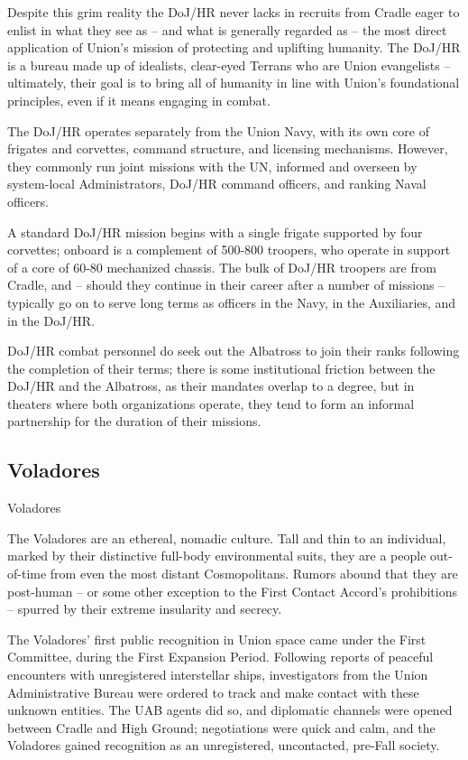 Despite this grim reality the DoJ/HR never lacks in recruits from Cradle eager to enlist in what
they see as -- and what is generally regarded as -- the most direct application of Union’s mission
of protecting and uplifting humanity. The DoJ/HR is a bureau made up of idealists, clear-eyed
Terrans who are Union evangelists -- ultimately, their goal is to bring all of humanity in line with
Union’s foundational principles, even if it means engaging in combat.

The DoJ/HR operates separately from the Union Navy, with its own core of frigates and corvettes,
command structure, and licensing mechanisms. However, they commonly run joint missions with
the UN, informed and overseen by system-local Administrators, DoJ/HR command officers, and
ranking Naval officers.

A standard DoJ/HR mission begins with a single frigate supported by four corvettes; onboard is a
complement of 500-800 troopers, who operate in support of a core of 60-80 mechanized chassis.
The bulk of DoJ/HR troopers are from Cradle, and -- should they continue in their career after a
number of missions -- typically go on to serve long terms as officers in the Navy, in the Auxiliaries,
and in the DoJ/HR.

DoJ/HR combat personnel do seek out the Albatross to join their ranks following the completion of
their terms; there is some institutional friction between the DoJ/HR and the Albatross, as their
mandates overlap to a degree, but in theaters where both organizations operate, they tend to form
an informal partnership for the duration of their missions.



\subsection{Voladores}

Voladores

The Voladores are an ethereal, nomadic culture. Tall and thin to an individual, marked by their
distinctive full-body environmental suits, they are a people out-of-time from even the most
distant Cosmopolitans. Rumors abound that they are post-human -- or some other exception to
the First Contact Accord’s prohibitions -- spurred by their extreme insularity and secrecy.


The Voladores’ first public recognition in Union space came under the First Committee, during
the First Expansion Period. Following reports of peaceful encounters with unregistered
interstellar ships, investigators from the Union Administrative Bureau were ordered to track and
make contact with these unknown entities. The UAB agents did so, and diplomatic channels
were opened between Cradle and High Ground; negotiations were quick and calm, and the
Voladores gained recognition as an unregistered, uncontacted, pre-Fall society.


